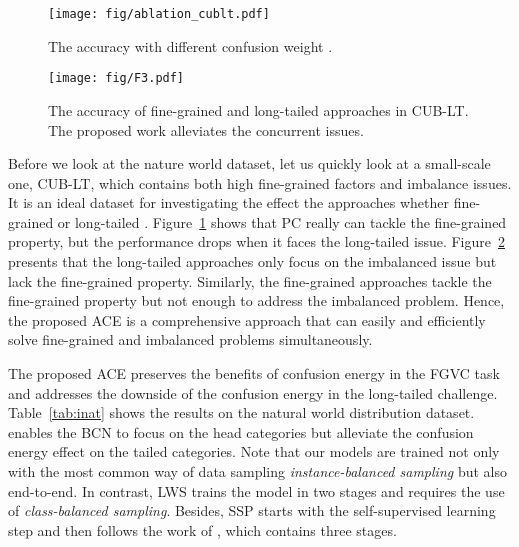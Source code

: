 \documentclass{article}
\begin{document}
\begin{figure}[ht!]
    \centering
    \texttt{[image: fig/ablation\_cublt.pdf]}
    \caption{The accuracy with different confusion weight .}
    \label{fig:cub_lt}
    \vspace{-10pt}
\end{figure}

\begin{figure}[ht]
    \centering
    \texttt{[image: fig/F3.pdf]}
    \caption{The accuracy of fine-grained and long-tailed approaches in CUB-LT. The proposed work alleviates the concurrent issues.}
    \label{tab:cub_lt}
    \vspace{-10pt}
\end{figure}

Before we look at the nature world dataset, let us quickly look at a small-scale one, CUB-LT, which contains both high fine-grained factors and imbalance issues. It is an ideal dataset for investigating the effect the approaches whether fine-grained \cite{dubey2018pairwise,DBLP:conf/eccv/DuCBXMSG20} or long-tailed \cite{Kang2020Decoupling,samuel2021generalized}. Figure~\ref{fig:cub_lt} shows that PC really can tackle the fine-grained property, but the performance drops when it faces the long-tailed issue. Figure~\ref{tab:cub_lt} presents that the long-tailed approaches only focus on the imbalanced issue but lack the fine-grained property. Similarly, the fine-grained approaches tackle the fine-grained property but not enough to address the imbalanced problem. Hence, the proposed ACE is a comprehensive approach that can easily and efficiently solve fine-grained and imbalanced problems simultaneously.

The proposed ACE preserves the benefits of confusion energy in the FGVC task and addresses the downside of the confusion energy in the long-tailed challenge. Table~\ref{tab:inat} shows the results on the natural world distribution dataset.  enables the BCN to focus on the head categories but alleviate the confusion energy effect on the tailed categories. Note that our models are trained not only with the most common way of data sampling {\em instance-balanced sampling} but also end-to-end. In contrast, LWS \cite{Kang2020Decoupling} trains the model in two stages and requires the use of {\em class-balanced sampling}. Besides, SSP \cite{DBLP:conf/nips/YangX20} starts with the self-supervised learning step and then follows the work of \cite{Kang2020Decoupling}, which contains three stages.
\end{document}
